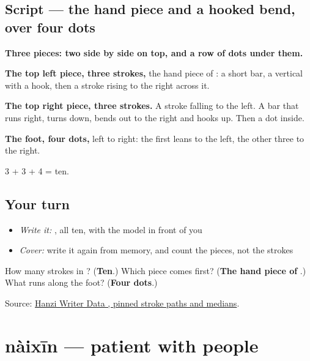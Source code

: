 \subsection*{Script — the hand piece and a hooked bend, over four dots}

\begin{quote}
\end{quote}

\textbf{Three pieces: two side by side on top, and a row of dots under them.}

\textbf{The top left piece, three strokes,} the hand piece of : a short bar, a vertical with a hook, then a stroke rising to the right across it.

\textbf{The top right piece, three strokes.} A stroke falling to the left. A bar that runs right, turns down, bends out to the right and hooks up. Then a dot inside.

\textbf{The foot, four dots,} left to right: the first leans to the left, the other three to the right.

3 + 3 + 4 = ten.

\subsection*{Your turn}
\begin{itemize}
\raggedright
  \item \emph{Write it:} , all ten, with the model in front of you
  \item \emph{Cover:} write it again from memory, and count the pieces, not the strokes
\end{itemize}

\begin{tcolorbox}[breakable,colback=teal!4,colframe=teal!35!black,title={Before you move on}]
How many strokes in ? (\textbf{Ten}.) Which piece comes first? (\textbf{The hand piece of }.) What runs along the foot? (\textbf{Four dots}.)

Source: \href{https://raw.githubusercontent.com/chanind/hanzi-writer-data/68d10a4b21150cae5e1ebbd223eed289cf32d90c/data/\%E7\%83\%AD.json}{Hanzi Writer Data , pinned stroke paths and medians}.
\end{tcolorbox}
\section[nàixīn]{nàixīn — patient with people}

